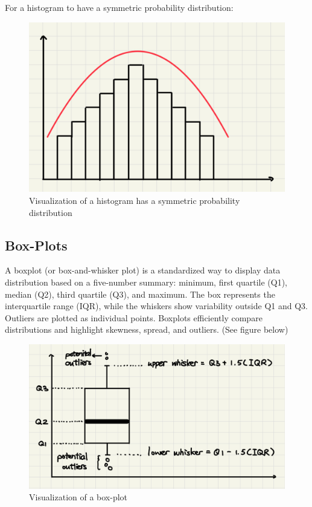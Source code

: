 \noindent
For a histogram to have a symmetric probability distribution:

\begin{figure}[H]
 \centering
 \includegraphics[scale=0.25]{Section1/img/HisS.jpg}
 \caption{Visualization of a histogram has a symmetric probability distribution}
\end{figure} 

\subsection{Box-Plots}
A boxplot (or box-and-whisker plot) is a standardized way to display data distribution based on a five-number summary: minimum, first quartile (Q1), median (Q2), third quartile (Q3), and maximum. The box represents the interquartile range (IQR), while the whiskers show variability outside Q1 and Q3. Outliers are plotted as individual points. Boxplots efficiently compare distributions and highlight skewness, spread, and outliers. (See figure below)

\begin{figure}[H]
 \centering
 \includegraphics[scale=0.25]{Section1/img/BoxPlot.jpg}
 \caption{Visualization of a box-plot}
\end{figure} 

